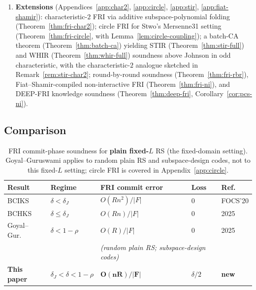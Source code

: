 \documentclass[11pt]{article}
\begin{document}
\begin{enumerate}[label=(\roman*)]
\item \textbf{Extensions} (Appendices~\ref{app:char2}, \ref{app:circle}, \ref{app:stir}, \ref{app:fiat-shamir}): characteristic-$2$ FRI via additive subspace-polynomial folding (Theorem~\ref{thm:fri-char2}); circle FRI for Stwo's Mersenne31 setting (Theorem~\ref{thm:fri-circle}, with Lemma~\ref{lem:circle-coupling}); a batch-CA theorem (Theorem~\ref{thm:batch-ca}) yielding STIR (Theorem~\ref{thm:stir-full}) and WHIR (Theorem~\ref{thm:whir-full}) soundness above Johnson in odd characteristic, with the characteristic-$2$ analogue sketched in Remark~\ref{rem:stir-char2}; round-by-round soundness (Theorem~\ref{thm:fri-rbr}), Fiat--Shamir-compiled non-interactive FRI (Theorem~\ref{thm:fri-ni}), and DEEP-FRI knowledge soundness (Theorem~\ref{thm:deep-fri}, Corollary~\ref{cor:pcs-ni}).
\end{enumerate}

\subsection{Comparison}

\begin{table}[h]
\centering
\small
\begin{tabular}{lllll}
\toprule
Result & Regime & FRI commit error & Loss & Ref. \\
\midrule
BCIKS~\cite{BCIKS} & $\delta < \delta_J$ & $O(Rn^2)/|F|$ & 0 & FOCS'20 \\
BCHKS~\cite{BCHKS} & $\delta \leq \delta_J$ & $O(Rn)/|F|$ & 0 & 2025 \\
Goyal--Gur.~\cite{GoyalGuruswami} & $\delta < 1{-}\rho$ & $O(R)/|F|$ & 0 & 2025 \\
& & \multicolumn{2}{l}{\emph{(random plain RS; subspace-design codes)}} \\
\textbf{This paper} & $\delta_J < \delta < 1{-}\rho$ & $\mathbf{O(nR)/|F|}$ & $\delta/2$ & \textbf{new} \\
\bottomrule
\end{tabular}
\caption{FRI commit-phase soundness for \textbf{plain fixed-$L$} RS (the fixed-domain setting). Goyal--Guruswami applies to random plain RS and subspace-design codes, not to this fixed-$L$ setting; circle FRI is covered in Appendix~\ref{app:circle}.}
\label{tab:commit-comparison}
\end{table}
\end{document}
